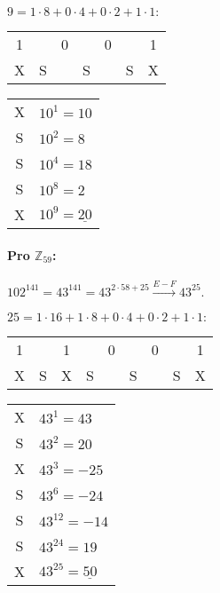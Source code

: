 \documentclass{article}
\begin{document}
$9 = 1\cdot8 + 0\cdot4 + 0\cdot2 + 1\cdot1:$ 

\begin{center}  %
  \begin{tabular}{c|c|c|c|c|c|c}
		1 &   & 0 &   & 0 &   & 1 \\ 
		X & S &   & S & 	& S & X \\
	\end{tabular}
\end{center}

\begin{center}
	\begin{tabular}{c|l}
		X & $10^1 = 10$ \\
		S & $10^2 = 8$ \\
		S & $10^4 = 18$ \\
		S & $10^8 = 2$ \\
		X & $10^9 = \underline{20}$
	\end{tabular}
\end{center}

\paragraph{Pro $\mathbb{Z}_{59}$: } $102^{141} = 43^{141} = 43^{2\cdot58 + 25} \stackrel{E-F}{\rightarrow} 43^{25}$.

$25 = 1\cdot16 + 1\cdot8 + 0\cdot4 + 0\cdot2 + 1\cdot1:$ 

\begin{center}  %
  \begin{tabular}{c|c|c|c|c|c|c|c|c}
		1 & 	& 1 &   & 0 &   & 0 &   & 1 \\ 
		X & S & X & S & 	& S &		& S	&	X \\
	\end{tabular}
\end{center}

\begin{center}
	\begin{tabular}{c|l}
		X & $43^1 = 43$ \\
		S & $43^2 = 20$ \\
		X & $43^3 = -25$ \\
		S & $43^6 = -24$ \\
		S & $43^{12} = -14$ \\
		S & $43^{24} = 19$ \\
		X & $43^{25} = \underline{50}$
	\end{tabular}
\end{center}
 
\end{document}
